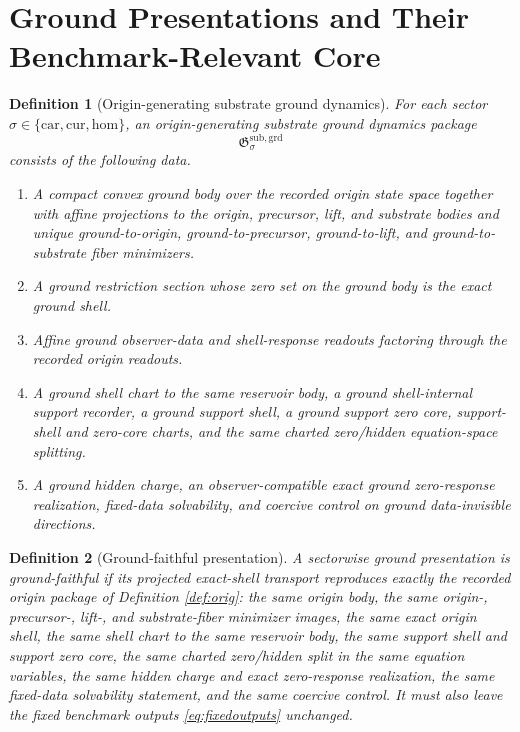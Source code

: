 \documentclass[11pt]{article}
\newcommand{\Car}{\mathrm{car}}
\newcommand{\Cur}{\mathrm{cur}}
\newcommand{\Hom}{\mathrm{hom}}
\newcommand{\GroundPackage}{\mathfrak G^{\mathrm{sub,grd}}}
\newtheorem{definition}{Definition}
\begin{document}
\section{Ground Presentations and Their Benchmark-Relevant Core}

\begin{definition}[Origin-generating substrate ground dynamics]
\label{def:ground}
For each sector \(\sigma\in\{\Car,\Cur,\Hom\}\), an \emph{origin-generating substrate ground dynamics package}
\[
\GroundPackage_{\sigma}
\]
consists of the following data.
\begin{enumerate}
    \item A compact convex ground body over the recorded origin state space together with affine projections to the origin, precursor, lift, and substrate bodies and unique ground-to-origin, ground-to-precursor, ground-to-lift, and ground-to-substrate fiber minimizers.
    \item A ground restriction section whose zero set on the ground body is the exact ground shell.
    \item Affine ground observer-data and shell-response readouts factoring through the recorded origin readouts.
    \item A ground shell chart to the same reservoir body, a ground shell-internal support recorder, a ground support shell, a ground support zero core, support-shell and zero-core charts, and the same charted zero/hidden equation-space splitting.
    \item A ground hidden charge, an observer-compatible exact ground zero-response realization, fixed-data solvability, and coercive control on ground data-invisible directions.
\end{enumerate}
\end{definition}

\begin{definition}[Ground-faithful presentation]
\label{def:faithful}
A sectorwise ground presentation is \emph{ground-faithful} if its projected exact-shell transport reproduces exactly the recorded origin package of Definition \ref{def:orig}: the same origin body, the same origin-, precursor-, lift-, and substrate-fiber minimizer images, the same exact origin shell, the same shell chart to the same reservoir body, the same support shell and support zero core, the same charted zero/hidden split in the same equation variables, the same hidden charge and exact zero-response realization, the same fixed-data solvability statement, and the same coercive control. It must also leave the fixed benchmark outputs \eqref{eq:fixedoutputs} unchanged.
\end{definition}
\end{document}
